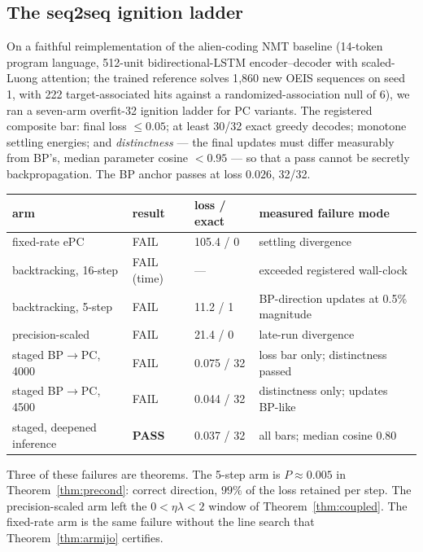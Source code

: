 \documentclass[11pt]{article}
\begin{document}
\subsection{The seq2seq ignition ladder}
\label{sec:ladder}

On a faithful reimplementation of the alien-coding NMT baseline \cite{gauthier2023}
(14-token program language, 512-unit bidirectional-LSTM encoder--decoder with scaled-Luong
attention; the trained reference solves 1{,}860 new OEIS sequences on seed 1, with 222
target-associated hits against a randomized-association null of 6), we ran a seven-arm
overfit-32 ignition ladder for PC variants. The registered composite bar: final loss
$\le 0.05$; at least 30/32 exact greedy decodes; monotone settling energies; and
\emph{distinctness} --- the final updates must differ measurably from BP's, median
parameter cosine $< 0.95$ --- so that a pass cannot be secretly backpropagation. The BP
anchor passes at loss $0.026$, 32/32.

\begin{center}
\small
\begin{tabular}{llll}
\toprule
arm & result & loss / exact & measured failure mode \\
\midrule
fixed-rate ePC & FAIL & 105.4 / 0 & settling divergence \\
backtracking, 16-step & FAIL (time) & --- & exceeded registered wall-clock \\
backtracking, 5-step & FAIL & 11.2 / 1 & BP-direction updates at 0.5\% magnitude \\
precision-scaled & FAIL & 21.4 / 0 & late-run divergence \\
staged BP$\to$PC, 4000 & FAIL & 0.075 / 32 & loss bar only; distinctness passed \\
staged BP$\to$PC, 4500 & FAIL & 0.044 / 32 & distinctness only; updates BP-like \\
staged, deepened inference & \textbf{PASS} & 0.037 / 32 & all bars; median cosine 0.80 \\
\bottomrule
\end{tabular}
\end{center}

Three of these failures are theorems. The 5-step arm is $P \approx 0.005$ in
Theorem~\ref{thm:precond}: correct direction, $99\%$ of the loss retained per step. The
precision-scaled arm left the $0 < \eta\lambda < 2$ window of
Theorem~\ref{thm:coupled}. The fixed-rate arm is the same failure without the line search
that Theorem~\ref{thm:armijo} certifies.
\end{document}
